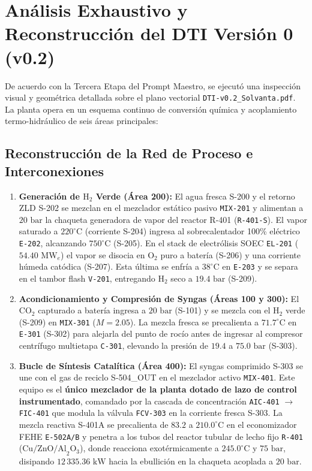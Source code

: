 \documentclass[10pt,letterpaper]{article}
\begin{document}
\section{Análisis Exhaustivo y Reconstrucción del DTI Versión 0 (v0.2)}
De acuerdo con la Tercera Etapa del Prompt Maestro, se ejecutó una inspección visual y geométrica detallada sobre el plano vectorial \texttt{DTI-v0.2\_Solvanta.pdf}. La planta opera en un esquema continuo de conversión química y acoplamiento termo-hidráulico de seis áreas principales:

\subsection{Reconstrucción de la Red de Proceso e Interconexiones}
\begin{enumerate}[leftmargin=*]
    \item \textbf{Generación de $\text{H}_2$ Verde (Área 200):} El agua fresca S-200 y el retorno ZLD S-202 se mezclan en el mezclador estático pasivo \texttt{MIX-201} y alimentan a $20\text{ bar}$ la chaqueta generadora de vapor del reactor R-401 (\texttt{R-401-S}). El vapor saturado a $220^\circ\text{C}$ (corriente S-204) ingresa al sobrecalentador 100\% eléctrico \texttt{E-202}, alcanzando $750^\circ\text{C}$ (S-205). En el stack de electrólisis SOEC \texttt{EL-201} ($54.40\text{ MW}_e$) el vapor se disocia en $\text{O}_2$ puro a batería (S-206) y una corriente húmeda catódica (S-207). Esta última se enfría a $38^\circ\text{C}$ en \texttt{E-203} y se separa en el tambor flash \texttt{V-201}, entregando $\text{H}_2$ seco a $19.4\text{ bar}$ (S-209).
    \item \textbf{Acondicionamiento y Compresión de Syngas (Áreas 100 y 300):} El $\text{CO}_2$ capturado a batería ingresa a $20\text{ bar}$ (S-101) y se mezcla con el $\text{H}_2$ verde (S-209) en \texttt{MIX-301} ($M = 2.05$). La mezcla fresca se precalienta a $71.7^\circ\text{C}$ en \texttt{E-301} (S-302) para alejarla del punto de rocío antes de ingresar al compresor centrífugo multietapa \texttt{C-301}, elevando la presión de $19.4$ a $75.0\text{ bar}$ (S-303).
    \item \textbf{Bucle de Síntesis Catalítica (Área 400):} El syngas comprimido S-303 se une con el gas de reciclo S-504\_OUT en el mezclador activo \texttt{MIX-401}. Este equipo es el \textbf{único mezclador de la planta dotado de lazo de control instrumentado}, comandado por la cascada de concentración \texttt{AIC-401} $\to$ \texttt{FIC-401} que modula la válvula \texttt{FCV-303} en la corriente fresca S-303. La mezcla reactiva S-401A se precalienta de $83.2$ a $210.0^\circ\text{C}$ en el economizador FEHE \texttt{E-502A/B} y penetra a los tubos del reactor tubular de lecho fijo \texttt{R-401} ($\text{Cu/ZnO/Al}_2\text{O}_3$), donde reacciona exotérmicamente a $245.0^\circ\text{C}$ y $75\text{ bar}$, disipando $12\,335.36\text{ kW}$ hacia la ebullición en la chaqueta acoplada a $20\text{ bar}$.

\end{enumerate}
\end{document}
